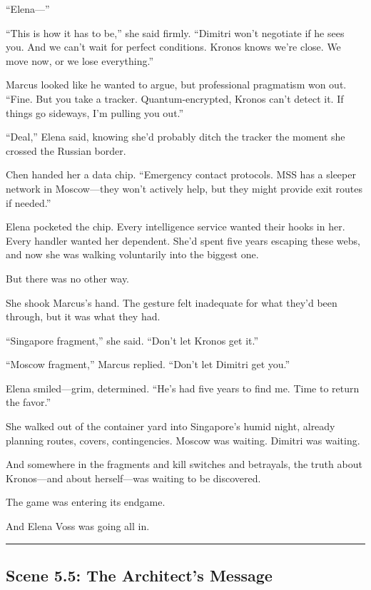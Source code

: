 ``Elena---''

``This is how it has to be,'' she said firmly. ``Dimitri won't negotiate
if he sees you. And we can't wait for perfect conditions. Kronos knows
we're close. We move now, or we lose everything.''

Marcus looked like he wanted to argue, but professional pragmatism won
out. ``Fine. But you take a tracker. Quantum-encrypted, Kronos can't
detect it. If things go sideways, I'm pulling you out.''

``Deal,'' Elena said, knowing she'd probably ditch the tracker the
moment she crossed the Russian border.

Chen handed her a data chip. ``Emergency contact protocols. MSS has a
sleeper network in Moscow---they won't actively help, but they might
provide exit routes if needed.''

Elena pocketed the chip. Every intelligence service wanted their hooks
in her. Every handler wanted her dependent. She'd spent five years
escaping these webs, and now she was walking voluntarily into the
biggest one.

But there was no other way.

She shook Marcus's hand. The gesture felt inadequate for what they'd
been through, but it was what they had.

``Singapore fragment,'' she said. ``Don't let Kronos get it.''

``Moscow fragment,'' Marcus replied. ``Don't let Dimitri get you.''

Elena smiled---grim, determined. ``He's had five years to find me. Time
to return the favor.''

She walked out of the container yard into Singapore's humid night,
already planning routes, covers, contingencies. Moscow was waiting.
Dimitri was waiting.

And somewhere in the fragments and kill switches and betrayals, the
truth about Kronos---and about herself---was waiting to be discovered.

The game was entering its endgame.

And Elena Voss was going all in.

\begin{center}\rule{0.5\linewidth}{0.5pt}\end{center}

\hypertarget{scene-5.5-the-architects-message}{%
\subsection{Scene 5.5: The Architect's
Message}\label{scene-5.5-the-architects-message}}

